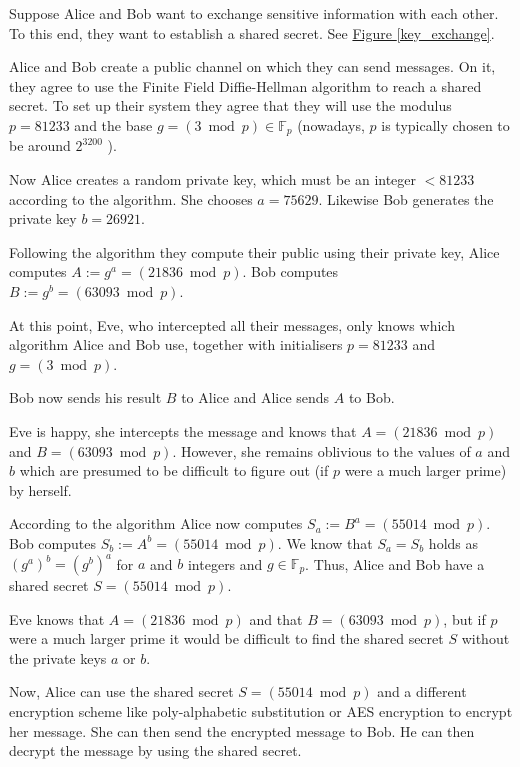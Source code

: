 \documentclass[openany, a4paper, 10pt]{book}
\theoremstyle{plain}
\theoremstyle{plain}
\theoremstyle{plain}
\theoremstyle{definition}
\theoremstyle{plain}
\theoremstyle{definition}
\theoremstyle{remark}
\newcommand{\figref}[1]{\hyperref[#1]{Figure \ref{#1}}}
\begin{document}
\begin{examplebox}[label={key_exch_example}, nameref={the example}]
    Suppose Alice and Bob want to exchange sensitive information with each other.
    To this end, they want to establish a shared secret.
    See \figref{key_exchange}.

    Alice and Bob create a public channel on which they can send messages.
    On it, they agree to use the Finite Field Diffie-Hellman algorithm to reach a shared secret.
    To set up their system they agree that they will use the modulus $p=81233$ and the base $g=(3 \bmod p) \in \mathbb F_p$ (nowadays, $p$ is typically chosen to be around $2^{3200}$ \cite{keysizes}).

    Now Alice creates a random private key, which must be an integer $< 81233$ according to the algorithm.
    She chooses $a=75629$.
    Likewise Bob generates the private key $b=26921$.

    Following the algorithm they compute their public using their private key,
    Alice computes $A:= g^a = (21836 \bmod p)$. Bob computes $B:= g^b = (63093 \bmod p)$.

    At this point, Eve, who intercepted all their messages, only knows which algorithm Alice and Bob use, together with initialisers $p=81233$ and $g=(3 \bmod p)$.

    Bob now sends his result $B$ to Alice and Alice sends $A$ to Bob.

    Eve is happy, she intercepts the message and knows that $A = (21836 \bmod p)$ and $B = (63093 \bmod p)$.
    However, she remains oblivious to the values of $a$ and $b$ which are presumed to be difficult to figure out (if $p$ were a much larger prime) by herself.

    According to the algorithm Alice now computes $S_a := B^a = (55014 \bmod p)$.
    Bob computes $S_b := A^b = (55014 \bmod p)$.
    We know that $S_a = S_b$ holds as $(g^a)^b = (g^b)^a$ for $a$ and $b$ integers and $g \in \mathbb F_p$.
    Thus, Alice and Bob have a shared secret $S = (55014 \bmod p)$.

    Eve knows that $A=(21836 \bmod p)$ and that $B=(63093 \bmod p)$, but if $p$ were a much larger prime it would be difficult to find the shared secret $S$ without the private keys $a$ or $b$.

    Now, Alice can use the shared secret $S=(55014 \bmod p)$ and a different encryption scheme like poly-alphabetic substitution or AES encryption to encrypt her message.
    She can then send the encrypted message to Bob.
    He can then decrypt the message by using the shared secret.
\end{examplebox}
\end{document}
